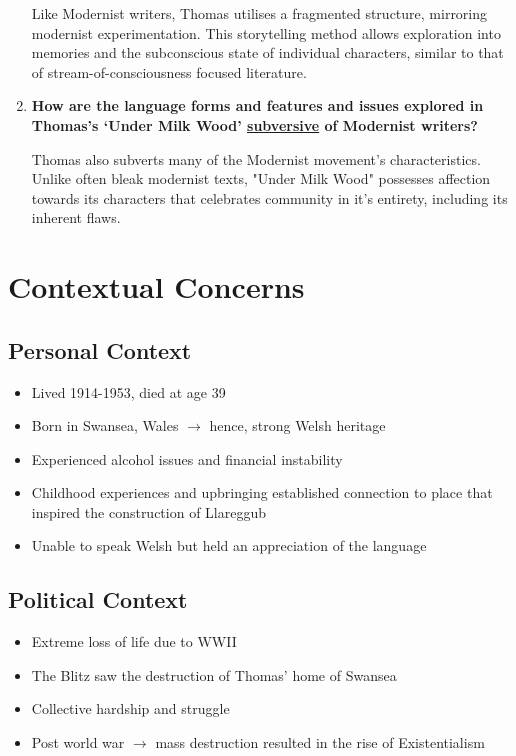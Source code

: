 \begin{enumerate}
			\subitem Like Modernist writers, Thomas utilises a fragmented structure, mirroring modernist experimentation. This storytelling method allows exploration into memories and the subconscious state of individual characters, similar to that of stream-of-consciousness focused literature. 

		\item \textbf{How are the language forms and features and issues explored in Thomas’s ‘Under Milk Wood’ \underline{subversive} of Modernist writers?}

			\subitem Thomas also subverts many of the Modernist movement's characteristics. Unlike often bleak modernist texts, "Under Milk Wood" possesses affection towards its characters that celebrates community in it's entirety, including its inherent flaws.
	\end{enumerate}

\section{Contextual Concerns}

	\subsection{Personal Context}
	
		\begin{itemize}
			\item Lived 1914-1953, died at age 39
			\item Born in Swansea, Wales $\rightarrow$ hence, strong Welsh heritage
			\item Experienced alcohol issues and financial instability
			\item Childhood experiences and upbringing established connection to place that inspired the construction of Llareggub
			\item Unable to speak Welsh but held an appreciation of the language
		\end{itemize}

	\subsection{Political Context}
	
		\begin{itemize}
			\item Extreme loss of life due to WWII
			\item The Blitz saw the destruction of Thomas' home of Swansea
			\item Collective hardship and struggle
			\item Post world war $\rightarrow$ mass destruction resulted in the rise of Existentialism
		\end{itemize}

